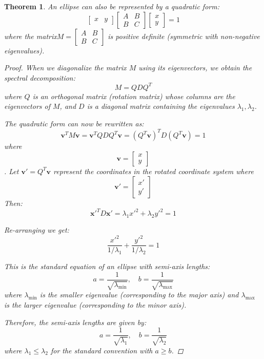 \documentclass{article}
\newtheorem{theorem}{Theorem}
\begin{document}
\begin{theorem}
An ellipse can also be represented by a quadratic form:
\[\begin{bmatrix}x & y\end{bmatrix} \begin{bmatrix}
A & B \\
B & C
\end{bmatrix} \begin{bmatrix}x \\
y\end{bmatrix} = 1\]
where the matrix\(M = \begin{bmatrix}
A & B \\
B & C
\end{bmatrix}\) is positive definite (symmetric with non-negative eigenvalues).
\begin{proof}

When we diagonalize the matrix $M$ using its eigenvectors, we obtain the spectral decomposition:
\[
M = QDQ^T
\]
where $Q$ is an orthogonal matrix (rotation matrix) whose columns are the eigenvectors of $M$, and $D$ is a diagonal matrix containing the eigenvalues $\lambda_1, \lambda_2$.

The quadratic form can now be rewritten as:
\[
\mathbf{v}^T M \mathbf{v} = \mathbf{v}^T QDQ^T \mathbf{v} = (Q^T\mathbf{v})^T D (Q^T\mathbf{v}) = 1
\]
where \[\mathbf{v} = \begin{bmatrix} x \\ y \end{bmatrix}\].
Let $\mathbf{v'} = Q^T\mathbf{v}$ represent the coordinates in the rotated coordinate system where 
\[\mathbf{v'} = \begin{bmatrix} x' \\ y' \end{bmatrix}\] Then:
\[
\mathbf{x}'^T D \mathbf{x}' = \lambda_1 {x'}^2 + \lambda_2 {y'}^2 = 1
\]

Re-arranging we get:
\[
\frac{{x'}^2}{1/\lambda_1} + \frac{{y'}^2}{1/\lambda_2} = 1
\]

This is the standard equation of an ellipse with semi-axis lengths:
\[
a = \frac{1}{\sqrt{\lambda_{\min}}}, \quad b = \frac{1}{\sqrt{\lambda_{\max}}}
\]
where $\lambda_{\min}$ is the smaller eigenvalue (corresponding to the major axis) and $\lambda_{\max}$ is the larger eigenvalue (corresponding to the minor axis).

Therefore, the semi-axis lengths are given by:
\[
\boxed{a = \frac{1}{\sqrt{\lambda_1}}, \quad b = \frac{1}{\sqrt{\lambda_2}}}
\]
where $\lambda_1 \leq \lambda_2$ for the standard convention with $a \geq b$.
\end{proof}
\end{theorem}
\end{document}
